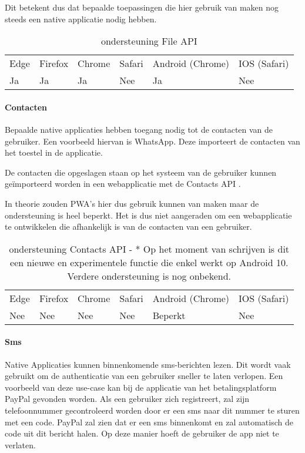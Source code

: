 Dit betekent dus dat bepaalde toepassingen die hier gebruik van maken nog steeds een native applicatie nodig hebben.

\begin{table}[]
	\begin{tabular}{llllll}
		Edge & Firefox & Chrome & Safari & Android (Chrome) & IOS (Safari) \\
		Ja   & Ja      &  Ja     & Nee     & Ja               & Nee          
	\end{tabular}	
	\caption{ondersteuning File API}
	\label{ondersteuning File API}
\end{table}	


\paragraph{Contacten}
Bepaalde native applicaties hebben toegang nodig tot de contacten van de gebruiker. Een voorbeeld hiervan is WhatsApp. Deze importeert de contacten van het toestel in de applicatie.

De contacten die opgeslagen staan op het systeem van de gebruiker kunnen geïmporteerd worden in een webapplicatie met de Contacts API \autocite{Tibbett2020}.

In theorie zouden PWA’s hier dus gebruik kunnen van maken maar de ondersteuning is heel beperkt. Het is dus niet aangeraden om een webapplicatie te ontwikkelen die afhankelijk is van de contacten van een gebruiker.

\begin{table}[]
	\begin{tabular}{llllll}
		Edge & Firefox & Chrome & Safari & Android (Chrome) & IOS (Safari) \\
		Nee   & Nee      &  Nee     & Nee     & Beperkt               & Nee          
	\end{tabular}	
	\caption{ondersteuning Contacts API - * Op het moment van schrijven is dit een nieuwe en experimentele functie die enkel werkt op 
	Android 10. Verdere ondersteuning is nog onbekend.
	}
	\label{ondersteuning Contacts API}
\end{table}	


\paragraph{Sms}
Native Applicaties kunnen binnenkomende sms-berichten lezen. Dit wordt vaak gebruikt om de authenticatie van een gebruiker sneller te laten verlopen. Een voorbeeld van deze use-case kan bij de applicatie van het betalingsplatform PayPal gevonden worden. Als een gebruiker zich registreert, zal zijn telefoonnummer gecontroleerd worden door er een sms naar dit nummer te sturen met een code. PayPal zal zien dat er een sms binnenkomt en zal automatisch de code uit dit bericht halen. Op deze manier hoeft de gebruiker de app niet te verlaten.

